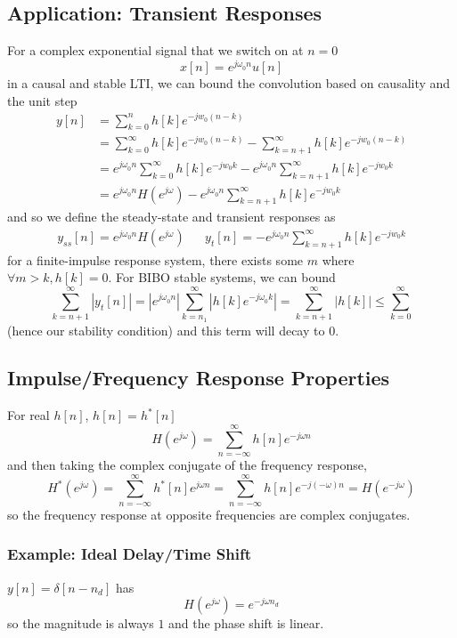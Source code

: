 \documentclass{article}
\newcommand{\jw}{{j\omega}}
\begin{document}
\subsection{Application: Transient Responses}
For a complex exponential signal that we switch on at $n=0$
\[
    x[n] = e^{\jw_0n}u[n]
\]
in a causal and stable LTI, we can bound the convolution based on causality and the unit step
\begin{align*}
    y[n] &= \sum_{k=0}^n h[k]e^{-jw_0(n-k)} \\
         &= \sum_{k=0}^\infty h[k]e^{-jw_0(n-k)} - \sum_{k=n+1}^\infty h[k]e^{-jw_0(n-k)} \\
         &= e^{\jw_0n}\sum_{k=0}^\infty h[k]e^{-jw_0k} - e^{\jw_0n}\sum_{k=n+1}^\infty h[k]e^{-jw_0k} \\
         &= e^{\jw_0n}H(e^\jw) - e^{\jw_0n}\sum_{k=n+1}^\infty h[k]e^{-jw_0k}
\end{align*}
and so we define the steady-state and transient responses as
\begin{align*}
	y_{ss}[n] = e^{\jw_0n}H(e^\jw) && y_{t}[n] =- e^{\jw_0n}\sum_{k=n+1}^\infty h[k]e^{-jw_0k}
\end{align*}
for a finite-impulse response system, there exists some $m$ where $\forall m > k, h[k]=0$. For BIBO stable systems, we can bound
\[
    \sum_{k=n+1}^\infty \left|y_t[n]\right| = \left|e^{\jw_0n}\right|\sum_{k=n_1}^\infty \left|h[k]e^{-\jw_0k}\right| = \sum_{k=n+1}^\infty |h[k]|\le \sum_{k=0}^\infty
\]
(hence our stability condition) and this term will decay to $0$.

\subsection{Impulse/Frequency Response Properties}
For real $h[n]$, $h[n]=h^*[n]$
\[
     H(e^{j\omega}) = \sum_{n=-\infty}^\infty h[n]e^{-j\omega n}
\]
and then taking the complex conjugate of the frequency response,
\[
    H^*(e^{j\omega})
                    = \sum_{n=-\infty}^\infty h^*[n]e^{j\omega n}
                    = \sum_{n=-\infty}^\infty h[n]e^{-j(-\omega) n}
                    = H(e^{-j\omega})
\]
so the frequency response at opposite frequencies are complex conjugates.


\subsubsection{Example: Ideal Delay/Time Shift}
$y[n] = \delta[n-n_d]$ has \[
    H(e^{j\omega}) = e^{-j\omega n_d}
\] so the magnitude is always $1$ and the phase shift is linear.
\end{document}
